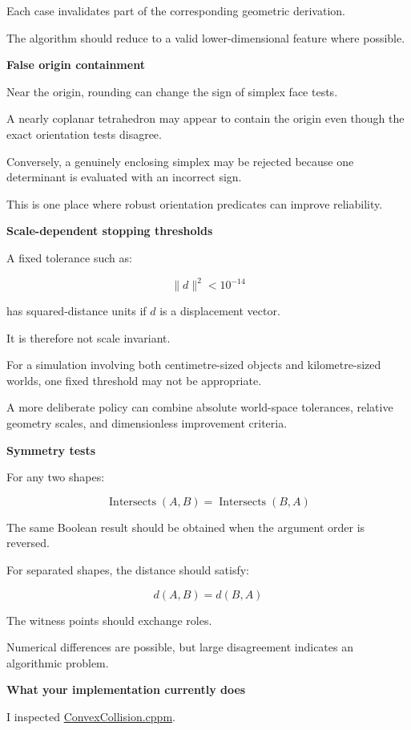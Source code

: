 Each case invalidates part of the corresponding geometric derivation.

The algorithm should reduce to a valid lower-dimensional feature where possible.

\textbf{False origin containment}

Near the origin, rounding can change the sign of simplex face tests.

A nearly coplanar tetrahedron may appear to contain the origin even though the exact orientation tests disagree.

Conversely, a genuinely enclosing simplex may be rejected because one determinant is evaluated with an incorrect sign.

This is one place where robust orientation predicates can improve reliability.

\textbf{Scale-dependent stopping thresholds}

A fixed tolerance such as:

\[
\|d\|^2<10^{-14}
\]

has squared-distance units if \(d\) is a displacement vector.

It is therefore not scale invariant.

For a simulation involving both centimetre-sized objects and kilometre-sized worlds, one fixed threshold may not be appropriate.

A more deliberate policy can combine absolute world-space tolerances, relative geometry scales, and dimensionless improvement criteria.

\textbf{Symmetry tests}

For any two shapes:

\[
\operatorname{Intersects}(A,B) = \operatorname{Intersects}(B,A)
\]

The same Boolean result should be obtained when the argument order is reversed.

For separated shapes, the distance should satisfy:

\[
d(A,B)=d(B,A)
\]

The witness points should exchange roles.

Numerical differences are possible, but large disagreement indicates an algorithmic problem.

\textbf{What your implementation currently does}

I inspected \href{https://github.com/swayam8624/KairoPhysicsEngine/blob/main/ConvexCollision.cppm?utm_source=chatgpt.com}{ConvexCollision.cppm}.

